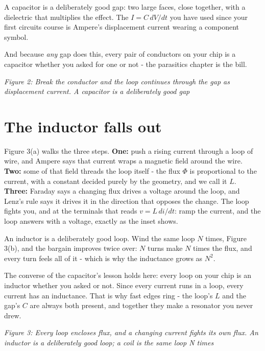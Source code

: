 A capacitor is a deliberately good gap: two large faces, close together,
with a dielectric that multiplies the effect. The \(I = C\, dV/dt\) you
have used since your first circuits course is Ampere's displacement
current wearing a component symbol.

And because \emph{any} gap does this, every pair of conductors on your
chip is a capacitor whether you asked for one or not - the parasitics
chapter is the bill.


{
\centering
{}
}

\emph{Figure 2: Break the conductor and the loop continues through the
gap as displacement current. A capacitor is a deliberately good gap}

\section{The inductor falls out}\label{the-inductor-falls-out}

Figure 3(a) walks the three steps. \textbf{One:} push a rising current
through a loop of wire, and Ampere says that current wraps a magnetic
field around the wire. \textbf{Two:} some of that field threads the loop
itself - the flux \(\Phi\) is proportional to the current, with a
constant decided purely by the geometry, and we call it \(L\).
\textbf{Three:} Faraday says a changing flux drives a voltage around the
loop, and Lenz's rule says it drives it in the direction that opposes
the change. The loop fights you, and at the terminals that reads
\(v = L\, di/dt\): ramp the current, and the loop answers with a
voltage, exactly as the inset shows.

An inductor is a deliberately good loop. Wind the same loop \(N\) times,
Figure 3(b), and the bargain improves twice over: \(N\) turns make \(N\)
times the flux, and every turn feels all of it - which is why the
inductance grows as \(N^2\).

The converse of the capacitor's lesson holds here: every loop on your
chip is an inductor whether you asked or not. Since every current runs
in a loop, every current has an inductance. That is why fast edges ring
- the loop's \(L\) and the gap's \(C\) are always both present, and
together they make a resonator you never drew.


{
\centering
{}
}

\emph{Figure 3: Every loop encloses flux, and a changing current fights
its own flux. An inductor is a deliberately good loop; a coil is the
same loop N times}

